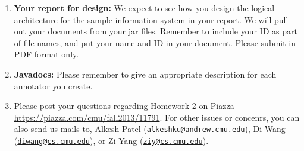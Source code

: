 \documentclass[oneside]{memoir}
\begin{document}
\begin{titlingpage}
\begin{minipage}{1.2\textwidth}
\begin{enumerate}
\item \textbf{Your report for design:} We expect to see how you design the
logical architecture for the sample information system in your report. We will
pull out your documents from your jar files. Remember to include your ID as part
of file names, and put your name and ID in your document. Please submit in PDF
format only.

\item \textbf{Javadocs:} Please remember to give an appropriate description for
each annotator you create.

\item Please post your questions regarding Homework 2 on Piazza
\url{https://piazza.com/cmu/fall2013/11791}. For other issues or concenrs, you
can also send us mails to, Alkesh Patel
(\href{mailto:alkeshku@andrew.cmu.edu}{\nolinkurl{alkeshku@andrew.cmu.edu}}), Di
Wang (\href{mailto:diwang@cs.cmu.edu}{\nolinkurl{diwang@cs.cmu.edu}}), or Zi
Yang (\href{mailto:ziy@cs.cmu.edu}{\nolinkurl{ziy@cs.cmu.edu}}).

\end{enumerate}

\end{minipage}
\hspace{-0.1\textwidth}

\end{titlingpage}




\end{document}
